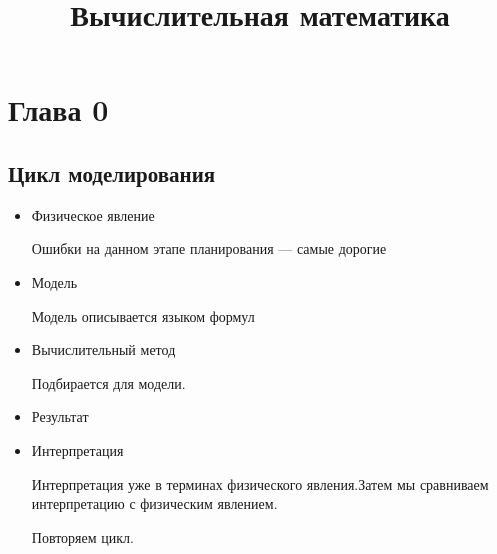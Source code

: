 \documentclass[oneside,final,14pt]{extreport}
\begin{document}
\title{Вычислительная математика}

\maketitle

\chapter*{Глава 0}
\section*{Цикл моделирования}
\begin{itemize}
	\item Физическое явление
	
	Ошибки на данном этапе планирования --- самые дорогие
	
	\item Модель
	
	Модель описывается языком формул
	
	\item Вычислительный метод
	
	Подбирается для модели.
	
	\item Результат
	
	\item Интерпретация
	
	Интерпретация уже в терминах физического явления.Затем мы сравниваем интерпретацию с физическим явлением.
	
	Повторяем цикл.
\end{itemize}
\end{document}
